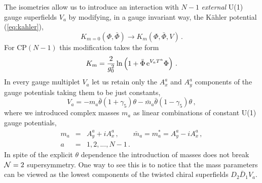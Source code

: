 \documentclass[epsfig,12pt]{article}
\def\beq{\begin{equation}}
\def\beqn{\begin{eqnarray}}
\def\eeqn{\end{eqnarray}}
\def\beqn{\begin{eqnarray}}
\def\eeqn{\end{eqnarray}}
\def\beq{\begin{equation}}
\begin{document}
The isometries allow us  to introduce an interaction with $N-1$ {\em external} 
U(1) gauge 
superfields $V_{a}$ by modifying, in a gauge invariant way,  the K\"ahler potential (\ref{eq:kahler}),
\begin{equation}
\label{eq:mkahler}
K_{m=0}(\Phi, \bar\Phi)\to
K_{m}(\Phi, \bar\Phi,V)\,.
\end{equation}
For CP$(N\!-\!1)$ this modification takes the form
\begin{equation}
\label{eq:mkahlerp}
K_{m}=\frac{2}{g_{0}^{2}}\ln \left(1+\bar\Phi\,{\rm e}^{V_{a}T^{a}}\Phi\right)\,.
\end{equation}
In every gauge multiplet $V_{a}$ let us retain only the $A^{a}_{x}$ and $A^{a}_{y}$ 
components of the gauge potentials taking them to be just constants,
\beq
V_{a}=-m_{a}\bar \theta(1+\gamma_{5})\theta -\bar m_{a}\bar \theta(1-\gamma_{5})\theta\,,
\label{wtpi1}
\end{equation}
where we introduced complex masses  $m_{a}$ as linear combinations of 
constant U(1) gauge potentials,
\beqn
m_{a}
&=&
A^{a}_{y}+iA^{a}_{x}\,,\qquad \bar m_{a}=m_{a}^{*}=A^{a}_{y}-iA^{a}_{x}\,,
\nonumber\\[2mm]
a 
&=&
 1,2, ..., N-1\,.
\label{wtpi2}
\eeqn
In spite  of the explicit $\theta$ dependence the introduction of masses does not 
break ${\cal N}=2$ supersymmetry.  One way to see this is to notice that the mass parameters 
can be viewed as the lowest components of the twisted chiral superfields
$D_{2}\bar D_{1}V_{a}$.
\end{document}
